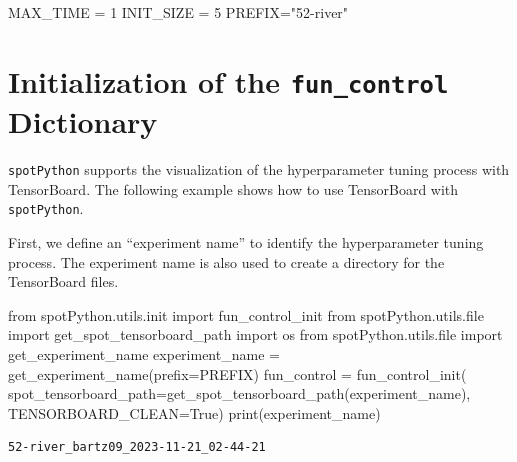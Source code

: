 \documentclass[
  letterpaper,
  DIV=11,
  numbers=noendperiod]{scrreprt}
\newenvironment{Shaded}{\begin{snugshade}}{\end{snugshade}}
\newcommand{\BuiltInTok}[1]{\textcolor[rgb]{0.00,0.23,0.31}{#1}}
\newcommand{\DecValTok}[1]{\textcolor[rgb]{0.68,0.00,0.00}{#1}}
\newcommand{\ImportTok}[1]{\textcolor[rgb]{0.00,0.46,0.62}{#1}}
\newcommand{\NormalTok}[1]{\textcolor[rgb]{0.00,0.23,0.31}{#1}}
\newcommand{\OperatorTok}[1]{\textcolor[rgb]{0.37,0.37,0.37}{#1}}
\newcommand{\StringTok}[1]{\textcolor[rgb]{0.13,0.47,0.30}{#1}}
\newcommand{\VariableTok}[1]{\textcolor[rgb]{0.07,0.07,0.07}{#1}}
\begin{document}
\begin{Shaded}
\begin{Highlighting}[]
\NormalTok{MAX\_TIME }\OperatorTok{=} \DecValTok{1}
\NormalTok{INIT\_SIZE }\OperatorTok{=} \DecValTok{5}
\NormalTok{PREFIX}\OperatorTok{=}\StringTok{"52{-}river"}
\end{Highlighting}
\end{Shaded}

\hypertarget{initialization-of-the-fun_control-dictionary-2}{%
\section{\texorpdfstring{Initialization of the \texttt{fun\_control}
Dictionary}{Initialization of the fun\_control Dictionary}}\label{initialization-of-the-fun_control-dictionary-2}}

\texttt{spotPython} supports the visualization of the hyperparameter
tuning process with TensorBoard. The following example shows how to use
TensorBoard with \texttt{spotPython}.

First, we define an ``experiment name'' to identify the hyperparameter
tuning process. The experiment name is also used to create a directory
for the TensorBoard files.

\begin{Shaded}
\begin{Highlighting}[]
\ImportTok{from}\NormalTok{ spotPython.utils.init }\ImportTok{import}\NormalTok{ fun\_control\_init}
\ImportTok{from}\NormalTok{ spotPython.utils.}\BuiltInTok{file} \ImportTok{import}\NormalTok{ get\_spot\_tensorboard\_path}
\ImportTok{import}\NormalTok{ os}
\ImportTok{from}\NormalTok{ spotPython.utils.}\BuiltInTok{file} \ImportTok{import}\NormalTok{ get\_experiment\_name}
\NormalTok{experiment\_name }\OperatorTok{=}\NormalTok{ get\_experiment\_name(prefix}\OperatorTok{=}\NormalTok{PREFIX)}
\NormalTok{fun\_control }\OperatorTok{=}\NormalTok{ fun\_control\_init(}
\NormalTok{    spot\_tensorboard\_path}\OperatorTok{=}\NormalTok{get\_spot\_tensorboard\_path(experiment\_name),}
\NormalTok{    TENSORBOARD\_CLEAN}\OperatorTok{=}\VariableTok{True}\NormalTok{)}
\BuiltInTok{print}\NormalTok{(experiment\_name)}
\end{Highlighting}
\end{Shaded}

\begin{verbatim}
52-river_bartz09_2023-11-21_02-44-21
\end{verbatim}
\end{document}
